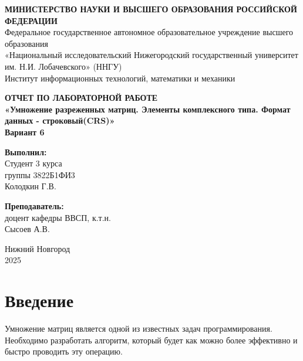 \documentclass[14pt,a4paper]{extarticle}
\begin{document}
\begin{titlepage}
\begin{center}

\onehalfspacing

\textbf{МИНИСТЕРСТВО НАУКИ И ВЫСШЕГО ОБРАЗОВАНИЯ РОССИЙСКОЙ ФЕДЕРАЦИИ} \\
Федеральное государственное автономное образовательное учреждение высшего образования \\
«Национальный исследовательский Нижегородский государственный университет им. Н.И. Лобачевского» (ННГУ) \\
Институт информационных технологий, математики и механики

\vspace{4cm}

\textbf{ОТЧЕТ ПО ЛАБОРАТОРНОЙ РАБОТЕ} \\
\textbf{«Умножение разреженных матриц. Элементы комплексного типа. Формат данных - строковый(CRS)»} \\
\textbf{Вариант 6}

\vspace{4cm}

\begin{flushright}
\textbf{Выполнил:} \\
Студент 3 курса \\
группы 3822Б1ФИ3 \\
Колодкин Г.В.

\vspace{1cm}

\textbf{Преподаватель:} \\
доцент кафедры ВВСП, к.т.н. \\
Сысоев А.В.
\end{flushright}

\vspace{1cm}

\begin{center}
Нижний Новгород\\
2025
\end{center}

\end{center}
\end{titlepage}

\tableofcontents
\newpage

\section{Введение}

Умножение матриц является одной из известных задач программирования. Необходимо разработать алгоритм, который будет как можно более эффективно и быстро проводить эту операцию.
\end{document}
